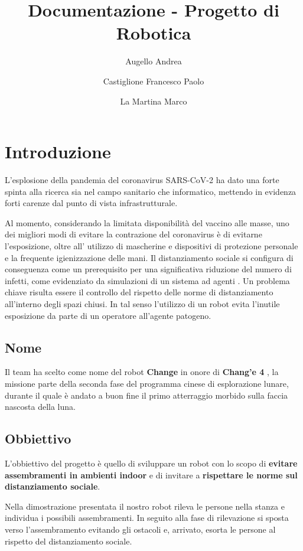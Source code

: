 \documentclass[a4paper]{article}
\begin{document}
	\title{Documentazione - Progetto di Robotica}
	\author{Augello Andrea \and Castiglione Francesco Paolo \and La Martina Marco}
	\maketitle
	\tableofcontents


	\section{Introduzione}\label{sec:Introduzione}
	L'esplosione della pandemia del coronavirus SARS-CoV-2 ha dato una forte
	spinta alla ricerca sia nel campo sanitario che informatico, mettendo in
	evidenza forti carenze dal punto di vista infrastrutturale.
	
	
	Al momento, considerando la limitata disponibilità del vaccino alle masse,
	uno dei migliori modi di evitare la contrazione del coronavirus è di
	evitarne l'esposizione, oltre all' utilizzo di mascherine e dispositivi di
	protezione personale e la frequente igienizzazione delle mani. Il
	distanziamento sociale si configura di conseguenza come un prerequisito per
	una significativa riduzione del numero di infetti, come evidenziato da
	simulazioni di un sistema ad agenti \cite{silva2020covid}. Un problema
	chiave risulta essere il controllo del rispetto delle norme di
	distanziamento all'interno degli spazi chiusi. In tal senso l'utilizzo di
	un robot evita l'inutile esposizione da parte di un operatore all'agente
	patogeno.
	
	\subsection{Nome}\label{subsec:Nome}
	Il team ha scelto come nome del robot \textbf{Change} in onore di \textbf{Chang'e 4}
	\cite{change4}, la missione parte della seconda fase del programma cinese
	di esplorazione lunare, durante il quale è andato a buon fine il primo
	atterraggio morbido sulla faccia nascosta della luna. 
	
	\subsection{Obbiettivo}\label{subsec:Obbiettivo} 
	L'obbiettivo del progetto è quello di sviluppare un robot con lo scopo di
	\textbf{evitare assembramenti in ambienti indoor} e di invitare a
	\textbf{rispettare le norme sul distanziamento sociale}. 
	
	Nella dimostrazione presentata il nostro robot rileva le persone nella
	stanza e individua i possibili assembramenti. In seguito alla fase di
	rilevazione si sposta verso l'assembramento evitando gli ostacoli e,
	arrivato, esorta le persone al rispetto del distanziamento sociale.
	
\end{document}
